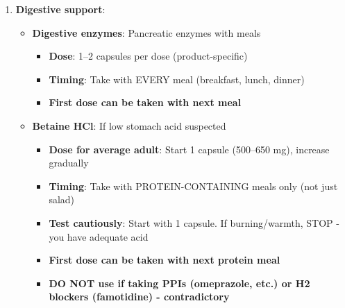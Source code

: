\begin{enumerate}
\begin{itemize}
        \item \textbf{Bone broth or collagen peptides}:
        \begin{itemize}
            \item \textbf{Dose}: 1--2 cups bone broth OR 10--20 g collagen powder
            \item \textbf{Timing}: Morning: 1 serving (can be added to coffee/tea), Evening: 1 serving
            \item \textbf{First dose can be taken ANY TIME today}
            \item Provides glycine, proline for barrier support
        \end{itemize}
    \end{itemize}

    \item \textbf{Digestive support}:
    \begin{itemize}
        \item \textbf{Digestive enzymes}: Pancreatic enzymes with meals
        \begin{itemize}
            \item \textbf{Dose}: 1--2 capsules per dose (product-specific)
            \item \textbf{Timing}: Take with EVERY meal (breakfast, lunch, dinner)
            \item \textbf{First dose can be taken with next meal}
        \end{itemize}

        \item \textbf{Betaine HCl}: If low stomach acid suspected
        \begin{itemize}
            \item \textbf{Dose for average adult}: Start 1 capsule (500--650 mg), increase gradually
            \item \textbf{Timing}: Take with PROTEIN-CONTAINING meals only (not just salad)
            \item \textbf{Test cautiously}: Start with 1 capsule. If burning/warmth, STOP - you have adequate acid
            \item \textbf{First dose can be taken with next protein meal}
            \item \textbf{DO NOT use if taking PPIs (omeprazole, etc.) or H2 blockers (famotidine) - contradictory}
        \end{itemize}
    \end{itemize}
\end{enumerate}

